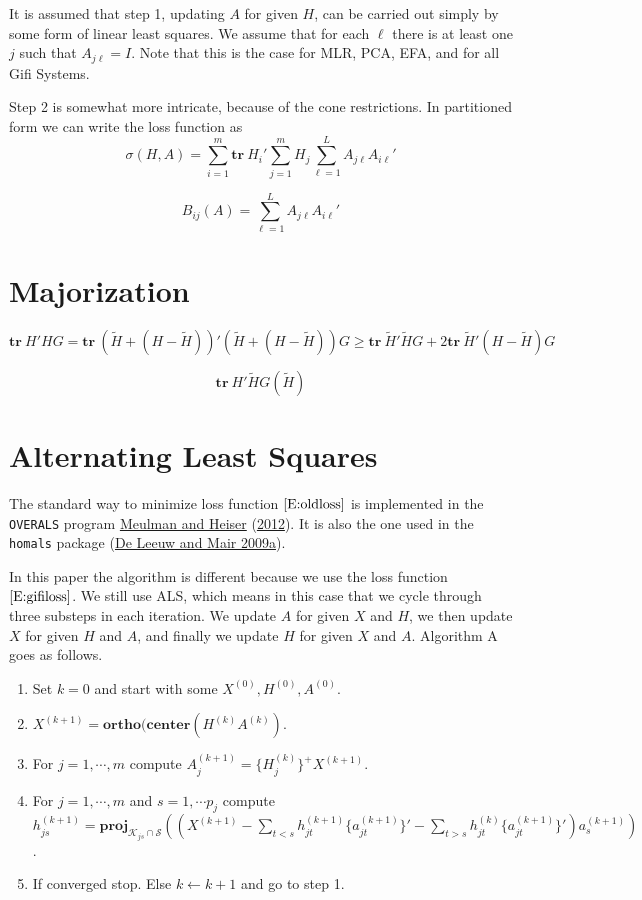 \documentclass[
  12pt,
]{book}
\providecommand{\tightlist}{%
  \setlength{\itemsep}{0pt}\setlength{\parskip}{0pt}}
\begin{document}
It is assumed that step 1, updating \(A\) for given \(H\), can be carried out simply by some form of linear least squares. We assume that for each \(\ell\) there is at least one \(j\) such that \(A_{j\ell}=I\). Note that this is the case for MLR, PCA, EFA, and for all Gifi Systems.

Step 2 is somewhat more intricate, because of the cone restrictions. In partitioned form we can write the loss function as
\[
\sigma(H,A)=\sum_{i=1}^m\mathbf{tr}\ H_i'\sum_{j=1}^mH_j\sum_{\ell=1}^LA_{j\ell}A_{i\ell}'
\]

\[
B_{ij}(A)=\sum_{\ell=1}^LA_{j\ell}A_{i\ell}'
\]

\hypertarget{majorization}{%
\section{Majorization}\label{majorization}}

\[
\mathbf{tr}\ H'HG=\mathbf{tr}\ (\tilde H + (H - \tilde H))'(\tilde H + (H - \tilde H))G\geq\mathbf{tr}\ \tilde H'\tilde HG+2\mathbf{tr}\ \tilde H'(H - \tilde H)G
\]

\[
\mathbf{tr}\ H'\tilde HG(\tilde H)
\]

\hypertarget{alternating-least-squares}{%
\section{Alternating Least Squares}\label{alternating-least-squares}}

The standard way to minimize loss function \(\eqref{E:oldloss}\) is implemented in the \texttt{OVERALS} program \protect\hyperlink{ref-meulman_heiser_12}{Meulman and Heiser} (\protect\hyperlink{ref-meulman_heiser_12}{2012}). It is also the one used in the \texttt{homals} package (\protect\hyperlink{ref-deleeuw_mair_A_09a}{De Leeuw and Mair 2009a}).

In this paper the algorithm is different because we use the loss function \(\eqref{E:gifiloss}\). We still use ALS, which means in this case that we cycle through three substeps in each iteration. We update \(A\) for given \(X\) and \(H\), we then update \(X\) for given \(H\) and \(A\), and finally we update \(H\) for given \(X\) and \(A\). Algorithm A goes as follows.

\begin{enumerate}
\def\labelenumi{\arabic{enumi}.}
\setcounter{enumi}{-1}
\tightlist
\item
  Set \(k=0\) and start with some \(X^{(0)},H^{(0)},A^{(0)}\).
\item
  \(X^{(k+1)}=\mathbf{ortho}(\mathbf{center}(H^{(k)}A^{(k)})\).
\item
  For \(j=1,\cdots,m\) compute \(A_j^{(k+1)}=\{H_j^{(k)}\}^+X^{(k+1)}\).
\item
  For \(j=1,\cdots,m\) and \(s=1,\cdots p_j\) compute \(h_{js}^{(k+1)}=\mathbf{proj}_{\mathcal{K}_{js}\cap\mathcal{S}}((X^{(k+1)}-\sum_{t<s}h_{jt}^{(k+1)}\{a_{jt}^{(k+1)}\}'-\sum_{t>s}h_{jt}^{(k)}\{a_{jt}^{(k+1)}\}')a_s^{(k+1)})\).
\item
  If converged stop. Else \(k\leftarrow k+1\) and go to step 1.
\end{enumerate}
\end{document}

